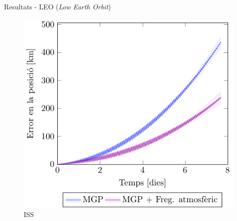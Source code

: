 \documentclass{beamer} %
\begin{document}
\begin{frame}{Resultats - LEO (\emph{Low Earth Orbit})}
\begin{figure}[htbp]
\begin{minipage}[ht]{0.45\textwidth}
      \includegraphics[width=\textwidth]{../Images/simulation/ISS_ca.pdf}
      \caption{\hspace{0.8cm}ISS}
    \end{minipage}
  \end{figure}
\end{frame}
\end{document}
